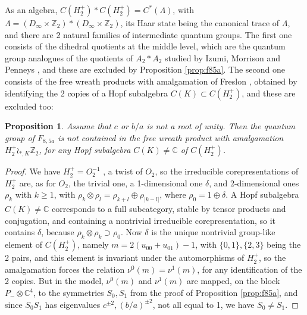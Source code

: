 \documentclass[11pt]{amsart}
\newtheorem{proposition}[theorem]{Proposition}
\begin{document}
As an algebra, $C(H_2^+)*C(H_2^+)=C^*(\Lambda)$, with $\Lambda=(D_\infty\times\mathbb Z_2)*(D_\infty\times\mathbb Z_2)$, its Haar state being the canonical trace of $\Lambda$, and there are 2 natural families of intermediate quantum groups. The first one consists of the dihedral quotients at the middle level, which are the quantum group analogues of the quotients of $A_2*A_2$ studied by Izumi, Morrison and Penneys \cite{imp}, and these are excluded by Proposition \ref{prop:f85a}. The second one consists of the free wreath products with amalgamation of Freslon \cite{fre}, obtained by identifying the 2 copies of a Hopf subalgebra $C(K)\subset C(H_2^+)$, and these are excluded too:

\begin{proposition}\label{prop:amalg}
Assume that $c$ or $b/a$ is not a root of unity. Then the quantum group of $F_{8,5a}$ is not contained in the free wreath product with amalgamation $H_2^+\wr_{*,K}\mathbb Z_2$, for any Hopf subalgebra $C(K)\neq\mathbb C$ of $C(H_2^+)$.
\end{proposition}

\begin{proof}
We have $H_2^+=O_2^{-1}$ \cite{bbc}, a twist of $O_2$, so the irreducible corepresentations of $H_2^+$ are, as for $O_2$, the trivial one, a 1-dimensional one $\delta$, and 2-dimensional ones $\rho_k$ with $k\geq1$, with $\rho_k\otimes\rho_l=\rho_{k+l}\oplus\rho_{|k-l|}$, where $\rho_0=1\oplus\delta$. A Hopf subalgebra $C(K)\neq\mathbb C$ corresponds to a full subcategory, stable by tensor products and conjugation, and containing a nontrivial irreducible corepresentation, so it contains $\delta$, because $\rho_k\otimes\rho_k\supset\rho_0$. Now $\delta$ is the unique nontrivial group-like element of $C(H_2^+)$, namely $m=2(u_{00}+u_{01})-1$, with $\{0,1\},\{2,3\}$ being the 2 pairs, and this element is invariant under the automorphisms of $H_2^+$, so the amalgamation forces the relation $\nu^0(m)=\nu^1(m)$, for any identification of the 2 copies. But in the model, $\nu^0(m)$ and $\nu^1(m)$ are mapped, on the block $P_-\otimes\mathbb C^4$, to the symmetries $S_0,S_1$ from the proof of Proposition \ref{prop:f85a}, and since $S_0S_1$ has eigenvalues $c^{\pm2},(b/a)^{\pm2}$, not all equal to 1, we have $S_0\neq S_1$.
\end{proof}
\end{document}
